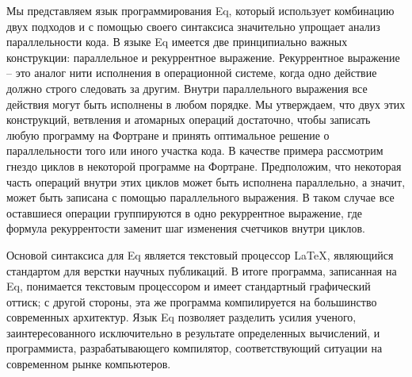 \documentclass[a4paper]{llncs}
\begin{document}
Мы представляем язык программирования Eq, который
использует комбинацию двух подходов и с помощью своего синтаксиса
значительно упрощает анализ параллельности кода.  В языке Eq имеется
две принципиально важных конструкции: параллельное и рекуррентное
выражение.  Рекуррентное выражение -- это аналог нити исполнения в
операционной системе, когда одно действие должно строго следовать за
другим.  Внутри параллельного выражения все действия могут быть
исполнены в любом порядке.  Мы утверждаем, что двух этих конструкций,
ветвления и атомарных операций достаточно, чтобы записать любую
программу на Фортране и принять оптимальное решение о параллельности
того или иного участка кода.  В качестве примера рассмотрим гнездо
циклов в некоторой программе на Фортране.  Предположим, что некоторая
часть операций внутри этих циклов может быть исполнена параллельно, а
значит, может быть записана с помощью параллельного выражения.  В
таком случае все оставшиеся операции группируются в одно рекуррентное
выражение, где формула рекуррентости заменит шаг изменения счетчиков
внутри циклов.  

Основой синтаксиса для Eq является текстовый процессор \LaTeX,
являющийся стандартом для верстки научных публикаций.  В итоге
программа, записанная на Eq, понимается текстовым процессором и имеет
стандартный графический оттиск; с другой стороны, эта же программа
компилируется на большинство современных архитектур.  Язык Eq
позволяет разделить усилия ученого, заинтересованного исключительно в
результате определенных вычислений, и программиста, разрабатывающего
компилятор, соответствующий ситуации на современном рынке компьютеров.
\end{document}
